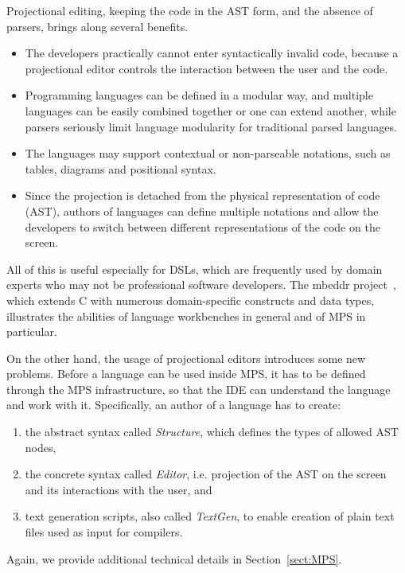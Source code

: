 Projectional editing, keeping the code in the AST form, and the absence of parsers, brings along several benefits.
\begin{itemize}
	\item The developers practically cannot enter syntactically invalid code, because a projectional editor controls the interaction between the user and the code.
	\item Programming languages can be defined in a modular way, and multiple languages can be easily combined together or one can extend another, while parsers seriously limit language modularity for traditional parsed languages.
	\item The languages may support contextual or non-parseable notations, such as tables, diagrams and positional syntax.
	\item Since the projection is detached from the physical representation of code (AST), authors of languages can define multiple notations and allow the developers to switch between different representations of the code on the screen.
\end{itemize}
All of this is useful especially for DSLs, which are frequently used by domain experts who may not be professional software developers.
The mbeddr project~\cite{ref:MBEDDR}, which extends C with numerous domain-specific constructs and data types, illustrates the abilities of language workbenches in general and of MPS in particular.

On the other hand, the usage of projectional editors introduces some new problems.
Before a language can be used inside MPS, it has to be defined through the MPS infrastructure, so that the IDE can understand the language and work with it.
Specifically, an author of a language has to create:
\begin{enumerate}
	\item the abstract syntax called \emph{Structure}, which defines the types of allowed AST nodes,
	\item the concrete syntax called \emph{Editor}, i.e. projection of the AST on the screen and its interactions with the user, and
	\item text generation scripts, also called \emph{TextGen}, to enable creation of plain text files used as input for compilers.
\end{enumerate}	
Again, we provide additional technical details in Section~\ref{sect:MPS}.


